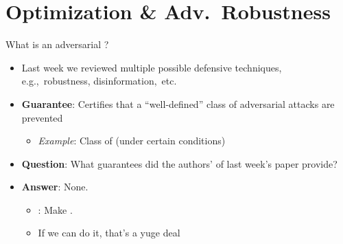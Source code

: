 \section{Optimization \& Adv.\ Robustness}


\begin{frame}{What is an adversarial ?}
  \begin{itemize}[<+->]
    \setlength{\itemsep}{20pt}
    \item Last week we reviewed multiple possible defensive techniques, e.g.,~robustness, disinformation,~etc.
    \item \textbf{Guarantee}: Certifies that a ``well-defined'' class of adversarial attacks are prevented
      \begin{itemize}
        \item \textit{Example}: Class of \textbf{} (under certain conditions)
      \end{itemize}

    \item \textbf{Question}: What guarantees did the authors' of last week's paper provide?
    \vspace{-14pt}
    \item \textbf{Answer}: None. 
      \begin{itemize}[<+->]
        \item \textbf{}: Make \textbf{}.
        \item If we can do it, that's a yuge deal
      \end{itemize}
  \end{itemize}
\end{frame}


